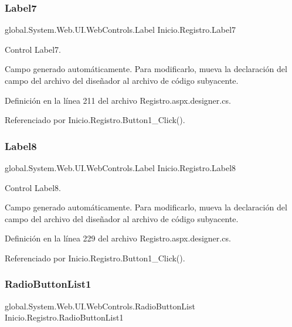 \subsubsection{\texorpdfstring{Label7}{Label7}}
{\footnotesize\ttfamily global.\+System.\+Web.\+U\+I.\+Web\+Controls.\+Label Inicio.\+Registro.\+Label7\hspace{0.3cm}{\ttfamily [protected]}}



Control Label7. 

Campo generado automáticamente. Para modificarlo, mueva la declaración del campo del archivo del diseñador al archivo de código subyacente. 

Definición en la línea 211 del archivo Registro.\+aspx.\+designer.\+cs.



Referenciado por Inicio.\+Registro.\+Button1\+\_\+\+Click().

\mbox{\label{classInicio_1_1Registro_a8f64d7bc53c3f17751f32a57cef78ddb}} 
\subsubsection{\texorpdfstring{Label8}{Label8}}
{\footnotesize\ttfamily global.\+System.\+Web.\+U\+I.\+Web\+Controls.\+Label Inicio.\+Registro.\+Label8\hspace{0.3cm}{\ttfamily [protected]}}



Control Label8. 

Campo generado automáticamente. Para modificarlo, mueva la declaración del campo del archivo del diseñador al archivo de código subyacente. 

Definición en la línea 229 del archivo Registro.\+aspx.\+designer.\+cs.



Referenciado por Inicio.\+Registro.\+Button1\+\_\+\+Click().

\mbox{\label{classInicio_1_1Registro_a6a93f0b66e0c307a8f53722f3f41ce91}} 
\subsubsection{\texorpdfstring{RadioButtonList1}{RadioButtonList1}}
{\footnotesize\ttfamily global.\+System.\+Web.\+U\+I.\+Web\+Controls.\+Radio\+Button\+List Inicio.\+Registro.\+Radio\+Button\+List1\hspace{0.3cm}{\ttfamily [protected]}}



